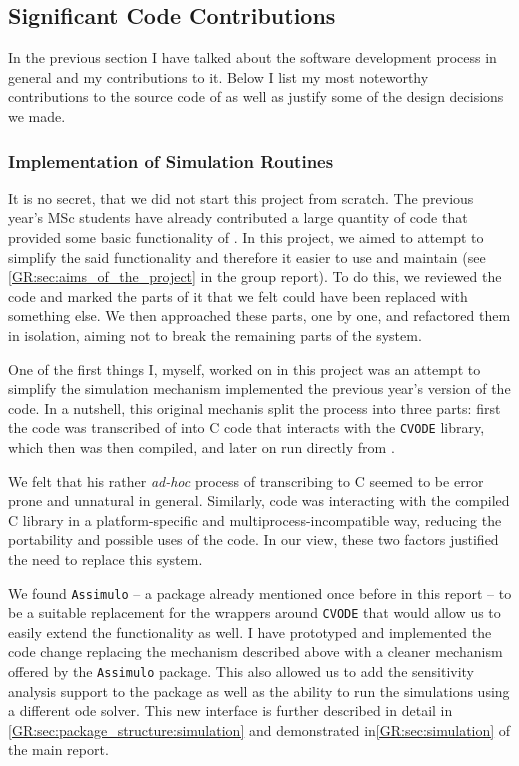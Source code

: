 \subsection{Significant Code Contributions}

In the previous section I have talked about the software development process in general and my contributions to it. 
Below I list my most noteworthy contributions to the source code of \means{} as well as justify some of the design decisions we made.

\subsubsection{Implementation of Simulation Routines}

It is no secret, that we did not start this project from scratch.
The previous year's MSc students have already contributed a large quantity of \py{} code that provided some basic functionality of \means{}. In this project, we aimed to attempt to simplify the said functionality and therefore it easier to use and maintain (see \autoref*{GR:sec:aims_of_the_project} in the group report).
To do this, we reviewed the code and marked the parts of it that we felt could have been replaced with something else. 
We then approached these parts, one by one, and refactored them in isolation, aiming not to break the remaining parts of the system.

One of the first things I, myself, worked on in this project was an attempt to simplify the simulation mechanism implemented the previous year's version of the code. In a nutshell, this original mechanis split the process into three parts: first the \python{} code was transcribed of into C code that interacts with the \verb"CVODE" library\cite{hindmarsh_sundials_2005}, which then was then compiled, and later on run directly from \py{}.

We felt that his rather \emph{ad-hoc} process of transcribing \py{} to C seemed to be error prone and unnatural in general. 
Similarly, \py{} code was interacting with the compiled C library in a platform-specific and multiprocess-incompatible way, reducing the portability and possible uses of the code. In our view, these two factors justified the need to replace this system.

We found \verb"Assimulo" -- a package already mentioned once before in this report -- to be a suitable replacement for the wrappers around \verb"CVODE" that would allow us to easily extend the functionality as well. 
I have prototyped and implemented the code change replacing the mechanism described above with a cleaner mechanism offered by the \verb"Assimulo" package. This also allowed us to add the sensitivity analysis support to the \means{} package as well as the ability to run the simulations using a different \gls{ode} solver.
This new interface is further described in detail in \autoref*{GR:sec:package_structure:simulation} and demonstrated in\autoref*{GR:sec:simulation} of the main report.

